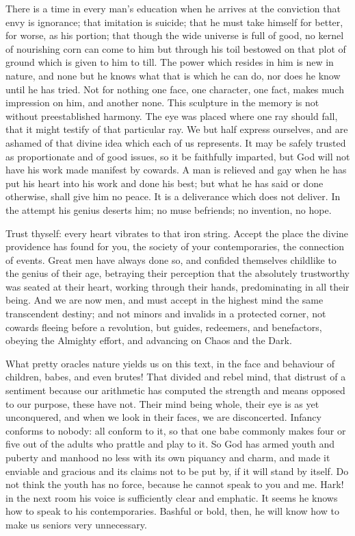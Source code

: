 \documentclass{article}
\begin{document}
There is a time in every man's education when he arrives at the conviction
that envy is ignorance; that imitation is suicide; that he must take himself
for better, for worse, as his portion; that though the wide universe is full
of good, no kernel of nourishing corn can come to him but through his toil
bestowed on that plot of ground which is given to him to till. The power
which resides in him is new in nature, and none but he knows what that is
which he can do, nor does he know until he has tried. Not for nothing one
face, one character, one fact, makes much impression on him, and another
none. This sculpture in the memory is not without preestablished harmony.
The eye was placed where one ray should fall, that it might testify of that
particular ray. We but half express ourselves, and are ashamed of that
divine idea which each of us represents. It may be safely trusted as
proportionate and of good issues, so it be faithfully imparted, but God will
not have his work made manifest by cowards. A man is relieved and gay when
he has put his heart into his work and done his best; but what he has said
or done otherwise, shall give him no peace. It is a deliverance which does
not deliver. In the attempt his genius deserts him; no muse befriends; no
invention, no hope.

Trust thyself: every heart vibrates to that iron string. Accept the place
the divine providence has found for you, the society of your contemporaries,
the connection of events. Great men have always done so, and confided
themselves childlike to the genius of their age, betraying their perception
that the absolutely trustworthy was seated at their heart, working through
their hands, predominating in all their being. And we are now men, and must
accept in the highest mind the same transcendent destiny; and not minors and
invalids in a protected corner, not cowards fleeing before a revolution, but
guides, redeemers, and benefactors, obeying the Almighty effort, and
advancing on Chaos and the Dark.

What pretty oracles nature yields us on this text, in the face and behaviour
of children, babes, and even brutes! That divided and rebel mind, that
distrust of a sentiment because our arithmetic has computed the strength and
means opposed to our purpose, these have not. Their mind being whole, their
eye is as yet unconquered, and when we look in their faces, we are
disconcerted. Infancy conforms to nobody: all conform to it, so that one
babe commonly makes four or five out of the adults who prattle and play to
it. So God has armed youth and puberty and manhood no less with its own
piquancy and charm, and made it enviable and gracious and its claims not to
be put by, if it will stand by itself. Do not think the youth has no force,
because he cannot speak to you and me. Hark! in the next room his voice is
sufficiently clear and emphatic. It seems he knows how to speak to his
contemporaries. Bashful or bold, then, he will know how to make us seniors
very unnecessary.
\end{document}
